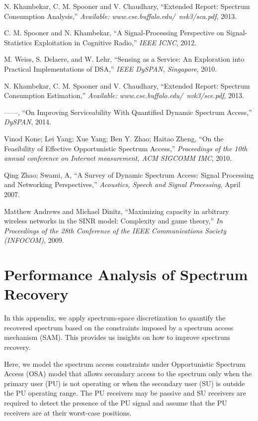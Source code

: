 \documentclass[journal,12pt,draftclsnofoot,onecolumn]{IEEEtran}
\begin{document}
\begin{thebibliography}{10}
{N. Khambekar, C. M. Spooner and V. Chaudhary}, ``{Extended Report: Spectrum
  Consumption Analysis},'' \emph{{Available:
  www.cse.buffalo.edu/~nvk3/sca.pdf}}, 2013.

{C. M. Spooner and N. Khambekar}, ``{A Signal-Processing Perspective on
  Signal-Statistics Exploitation in Cognitive Radio},'' \emph{{IEEE ICNC}},
  2012.

{M. Weiss, S. Delaere, and W. Lehr}, ``{Sensing as a Service: An Exploration
  into Practical Implementations of DSA},'' \emph{{IEEE DySPAN, Singapore}},
  2010.

{N. Khambekar, C. M. Spooner and V. Chaudhary}, ``{Extended Report: Spectrum
  Consumption Estimation},'' \emph{{Available:
  www.cse.buffalo.edu/~nvk3/sce.pdf}}, 2013.

------, ``{On Improving Serviceability With Quantified Dynamic Spectrum
  Access},'' \emph{DySPAN}, 2014.

{Vinod Kone; Lei Yang; Xue Yang; Ben Y. Zhao; Haitao Zheng}, ``{On the
  Feasibility of Effective Opportunistic Spectrum Access},'' \emph{Proceedings
  of the 10th annual conference on Internet measurement, ACM SIGCOMM IMC},
  2010.

{Qing Zhao; Swami, A}, ``{A Survey of Dynamic Spectrum Access: Signal
  Processing and Networking Perspectives},'' \emph{Acoustics, Speech and Signal
  Processing}, April 2007.

{{Matthew Andrews and Michael Dinitz}}, ``{Maximizing capacity in arbitrary
  wireless networks in the SINR model: Complexity and game theory},'' \emph{In
  Proceedings of the 28th Conference of the IEEE Communications Society
  (INFOCOM)}, 2009.

\end{thebibliography}


\appendices


\section{Performance Analysis of Spectrum Recovery}
In this appendix, we apply spectrum-space discretization to quantify the recovered spectrum based on the constraints imposed by a spectrum access mechanism (SAM). This provides us insights on how to improve spectrum recovery.

Here, we model the spectrum access constraints under Opportunistic Spectrum Access (OSA) model that allows secondary access to the spectrum only when the primary user (PU) is not operating or when the secondary user (SU) is outside the PU operating range. The PU receivers may be passive and SU receivers are required to detect the presence of the PU signal and assume that the PU receivers are at their worst-case positions.
\end{document}
